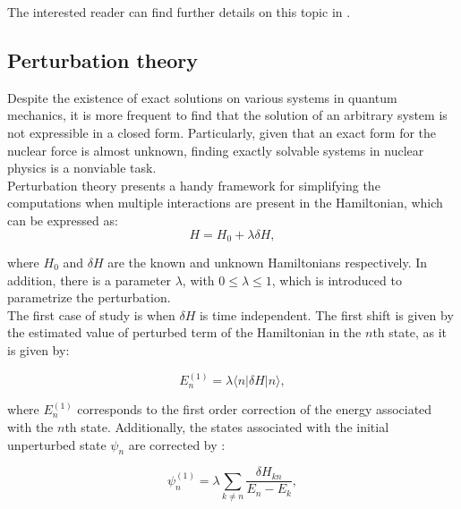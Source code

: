 \documentclass[openany]{book}
\begin{document}
The interested reader can find further details on this topic in  \cite{newton_2002}.

\subsection{Perturbation theory}\label{sub:perturbationTheory}

Despite the existence of exact solutions on various systems in quantum mechanics, it is more frequent to find that the solution of an arbitrary system is not expressible in a closed form. Particularly, given that an exact form for the nuclear force is almost unknown, finding exactly solvable systems in nuclear physics is a nonviable task. \\

Perturbation theory presents a handy framework for simplifying the computations when multiple interactions are present in the Hamiltonian, which can be expressed as: \\

\begin{equation} \label{eq:perturbationTheory_hamiltonian}
	H = H_0 + \lambda \delta H,
\end{equation}

where $H_0$ and $\delta H$ are the known and unknown Hamiltonians respectively. In addition, there is a parameter $\lambda$, with $0 \le \lambda \le 1$, which is introduced to parametrize the perturbation.  \\

The first case of study is when $\delta H$ is time independent.  The first shift is given by the estimated value of perturbed term of the Hamiltonian in the $n$th state, as it is given by: 

\begin{equation} \label{eq:perturbationTheory_timeIndependent_E1}
	E^{(1)}_n = \lambda \langle  n |\delta H| n \rangle,
\end{equation}

where $E^{(1)}_n$ corresponds to the first order correction of the energy associated with the $n$th state. Additionally, the states associated with the initial unperturbed state $\psi_n$ are corrected by \cite{dick_2016}:

\begin{equation} \label{eq:perturbationTheory_timeIndependent_psi1}
	\psi^{(1)}_n = \lambda \sum_{k \neq n}{\frac{\delta H_{kn}}{E_n - E_k}},
\end{equation}
\end{document}

